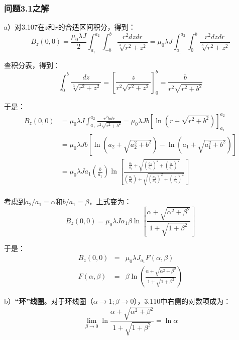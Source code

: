\subsubsection{问题3.1之解}

a）对3.107在$z$和$r$的合适区间积分，得到：
\begin{equation}
B_z(0,0)=\frac{\mu_0\lambda J}{2}\int_{a_1}^{a_2}\int_{-b}^{b}\frac{r^2dzdr}{\sqrt[3]{r^2+z^2}}=\mu_0\lambda J\int_{a_1}^{a_2}\int_{0}^{b}\frac{r^2dzdr}{\sqrt[3]{r^2+z^2}}%
\end{equation}

查积分表，得到：
\begin{equation}
\int_{0}^{b}\frac{dz}{\sqrt[3]{r^2+z^2}}=\left[\frac{z}{r^2\sqrt{r^2+z^2}}\right]_{0}^{b}=\frac{b}{r^2\sqrt{r^2+b^2}}%
\end{equation}

于是：
\begin{equation}
\begin{split}
B_z(0,0)&=\mu_0\lambda J\int_{a_1}^{a_2}\frac{r^2bdr}{r^2\sqrt{r^2+b^2}}=\mu_0\lambda Jb[\ln({r+\sqrt{r^2+b^2}})]_{a_1}^{a_2}\\
&=\mu_0\lambda Jb[\ln(a_2+\sqrt{a_2^2+b^2})-\ln(a_1+\sqrt{a_1^2+b^2})]\\
&=\mu_0\lambda Ja_1\left(\frac{b}{a_1}\right)\ln\left[\frac{\frac{a_2}{a_1}+\sqrt{(\frac{a_2}{a_1})^2+(\frac{b}{a_1})^2}}{(\frac{a_1}{a_2})+\sqrt{(\frac{a_1}{a_1})^2+(\frac{b}{a_1})^2}}\right]\\%
\end{split}
\end{equation}

考虑到$a_2/a_1=\alpha$和$b/a_1=\beta$，上式变为：
\begin{equation}
B_z(0,0)=\mu_0\lambda J\alpha_1\beta\ln\left[\frac{\alpha+\sqrt{\alpha^2+\beta^2}}{1+\sqrt{1+\beta^2}}\right]%
\end{equation}

于是：
\begin{eqnarray}
B_z(0,0)&=&\mu_0\lambda J_{a_1}F(\alpha,\beta)\\ %
F(\alpha,\beta)&=&\beta \ln\left(\frac{\alpha+\sqrt{\alpha^2+\beta^2}}{1+\sqrt{1+\beta^2}}\right)%
\end{eqnarray}

b）\textbf{“环”线圈}。对于环线圈（$\alpha\rightarrow 1; \beta\rightarrow 0$），3.110中右侧的对数项成为：
\begin{equation}
\lim_{\beta\rightarrow 0}\ln\frac{\alpha+\sqrt{\alpha^2+\beta^2}}{1+\sqrt{1+\beta^2}}=\ln\alpha%
\end{equation}

